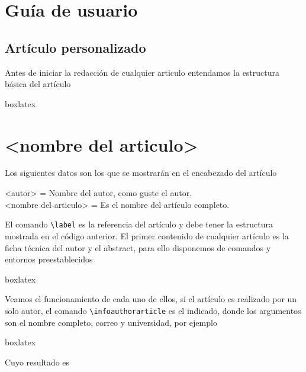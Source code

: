 {\justifying
	\chapter{Guía de usuario}\label{cap:guiaDeUsuario}
	\section{Artículo personalizado}
	Antes de iniciar la redacción de cualquier articulo entendamos la estructura básica del artículo
	\begin{tcblisting}{boxlatex}
	{\justifying
		\chapter{<nombre del articulo>}\label{art:<nombre del articulo upperCamelCase>}
	}\cleanalldata
	\end{tcblisting}
	Los siguientes datos son los que se mostrarán en el encabezado del artículo
	\begin{center}
		<autor>  = Nombre del autor, como guste el autor.\\  
		<nombre del articulo> = Es el nombre del artículo completo.\\
	\end{center}
	El comando \verb|\label| es la referencia del artículo y debe tener la estructura mostrada en el código anterior.\pap
	El primer contenido de cualquier artículo es la ficha técnica del autor y el abstract, para ello disponemos de comandos y entornos preestablecidos
	\begin{tcblisting}{boxlatex}
		\infoauthorarticle{}{}{}
		\begin{infoauthorarticlebox}
		\end{infoauthorarticlebox}
		\begin{abstract}
		\end{abstract}		
	\end{tcblisting}
	Veamos el funcionamiento de cada uno de ellos, si el artículo es realizado por un solo autor, el comando \verb|\infoauthorarticle| es el indicado, donde los argumentos son el nombre completo, correo y universidad, por ejemplo
	\begin{tcblisting}{boxlatex}
	\end{tcblisting}
	Cuyo resultado es
}
